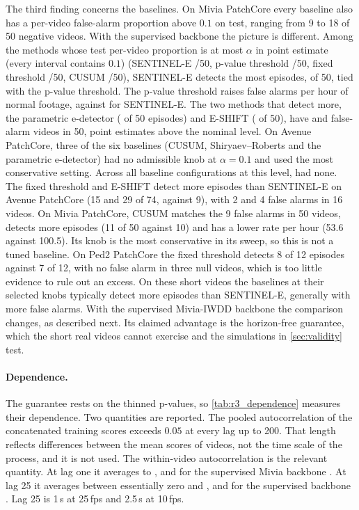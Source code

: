The third finding concerns the baselines. On Mivia PatchCore every baseline also has a per-video false-alarm proportion above $0.1$ on test, ranging from 9 to 18 of 50 negative videos. With the supervised backbone the picture is different. Among the methods whose test per-video proportion is at most $\alpha$ in point estimate (every interval contains $0.1$) (SENTINEL-E \RThreeSupSEFAk{}/50, p-value threshold \RThreeSupPValueFAk{}/50, fixed threshold \RThreeSupFixedFAk{}/50, CUSUM \RThreeSupCUSUMFAk{}/50), SENTINEL-E detects the most episodes, \RThreeSupSEDetk{} of 50, tied with the p-value threshold. The p-value threshold raises \RThreeSupPValueFAhrP{} false alarms per hour of normal footage, against \RThreeSupSEFAhrP{} for SENTINEL-E. The two methods that detect more, the parametric e-detector (\RThreeSupParamDetk{} of 50 episodes) and E-SHIFT (\RThreeSupEShiftDetk{} of 50), have \RThreeSupParamFAk{} and \RThreeSupEShiftFAk{} false-alarm videos in 50, point estimates above the nominal level. On Avenue PatchCore, three of the six baselines (CUSUM, Shiryaev--Roberts and the parametric e-detector) had no admissible knob at $\alpha=0.1$ and used the most conservative setting. Across all \RThreeBaselineConfigs{} baseline configurations at this level, \RThreeBaselineNoKnob{} had none. The fixed threshold and E-SHIFT detect more episodes than SENTINEL-E on Avenue PatchCore (15 and 29 of 74, against 9), with 2 and 4 false alarms in 16 videos. On Mivia PatchCore, CUSUM matches the 9 false alarms in 50 videos, detects more episodes (11 of 50 against 10) and has a lower rate per hour (53.6 against 100.5). Its knob is the most conservative in its sweep, so this is not a tuned baseline. On Ped2 PatchCore the fixed threshold detects 8 of 12 episodes against 7 of 12, with no false alarm in three null videos, which is too little evidence to rule out an excess. On these short videos the baselines at their selected knobs typically detect more episodes than SENTINEL-E, generally with more false alarms. With the supervised Mivia-IWDD backbone the comparison changes, as described next. Its claimed advantage is the horizon-free guarantee, which the short real videos cannot exercise and the simulations in \cref{sec:validity} test.

\paragraph{Dependence.} The guarantee rests on the thinned p-values, so
\cref{tab:r3_dependence} measures their dependence. Two quantities are
reported. The pooled autocorrelation of the concatenated training scores
exceeds $0.05$ at every lag up to 200. That length reflects differences
between the mean scores of videos, not the time scale of the process, and
it is not used. The within-video autocorrelation is the relevant quantity. At
lag one it averages \RThreeWithinLagOneMin{} to \RThreeWithinLagOneMax{}, and for the
supervised Mivia backbone \RThreeMiviaSupWithinLagOne{}. At lag 25 it averages between
essentially zero and \RThreeWithinLagTwentyFiveMax{}, and for the supervised backbone
\RThreeMiviaSupWithinLagTwentyFive{}. Lag 25 is 1\,s at 25\,fps and 2.5\,s at 10\,fps.

